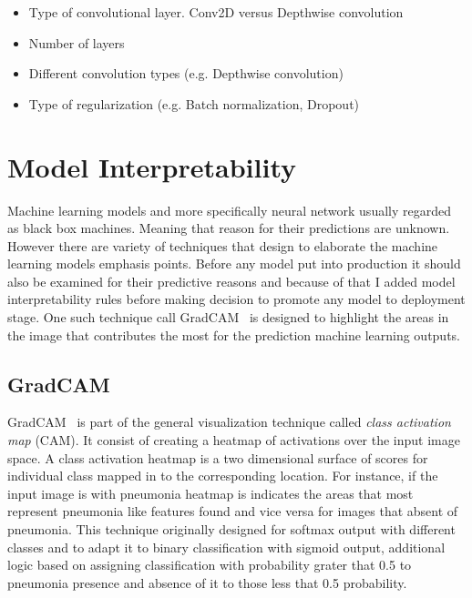 \begin{itemize}
    \item Type of convolutional layer. Conv2D versus Depthwise convolution
    \item Number of layers
    \item Different convolution types (e.g. Depthwise convolution)
    \item Type of regularization (e.g. Batch normalization, Dropout)
\end{itemize}

\section{Model Interpretability}
Machine learning models and more specifically neural network usually regarded as black box machines.
Meaning that reason for their predictions are unknown.
However there are variety of techniques that design to elaborate the machine learning models emphasis points.
Before any model put into production it should also be examined for their predictive reasons and because of that I added model interpretability rules before making decision to promote any model to deployment stage.
One such technique call GradCAM~\cite{heatmap} is designed to highlight the areas in the image that contributes the most for the prediction machine learning outputs.

\subsection{GradCAM}
GradCAM~\cite{heatmap} is part of the general visualization technique called \emph{class activation map} (CAM).
It consist of creating a heatmap of activations over the input image space.
A class activation heatmap is a two dimensional surface of scores for individual class mapped in to the corresponding location. For instance, if the input image is with pneumonia heatmap is indicates the areas that most represent pneumonia like features found and vice versa for images that absent of pneumonia.
This technique originally designed for softmax output with different classes and to adapt it to binary classification with sigmoid output, additional logic based on assigning classification with probability grater that 0.5 to pneumonia presence and absence of it to those less that 0.5 probability.

